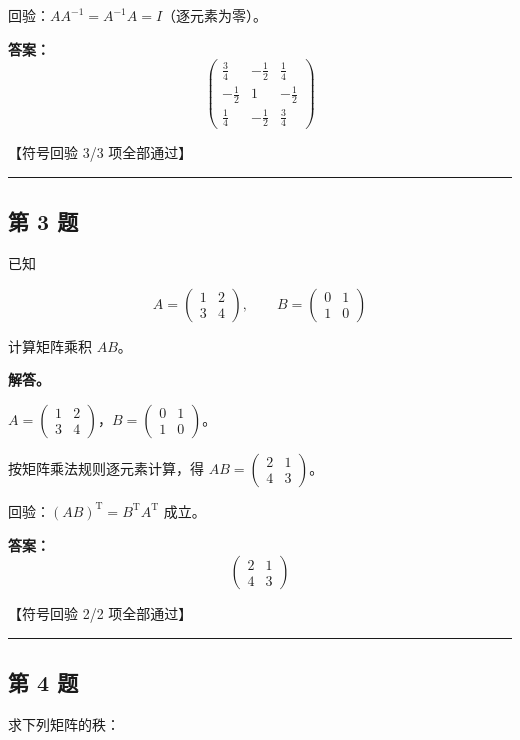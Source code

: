 \documentclass[12pt, a4paper]{article}
\newcommand{\problem}[1]{\subsection*{第 #1 题}}
\newcommand{\solution}{\textbf{解答。}}
\begin{document}
回验：$A A^{-1} = A^{-1} A = I$（逐元素为零）。

\textbf{答案：}
{\small
\[\begin{pmatrix} \frac{3}{4} & - \frac{1}{2} & \frac{1}{4} \\ - \frac{1}{2} & 1 & - \frac{1}{2} \\ \frac{1}{4} & - \frac{1}{2} & \frac{3}{4} \end{pmatrix}\]
}

\textcolor{okgreen}{【符号回验 3/3 项全部通过】}

\vspace{0.8em}
\hrule
\vspace{0.8em}

\problem{3}

已知

$$
A = \begin{pmatrix} 1 & 2 \\ 3 & 4 \end{pmatrix}, \qquad
B = \begin{pmatrix} 0 & 1 \\ 1 & 0 \end{pmatrix}
$$

计算矩阵乘积 $AB$。

\solution

$A = \begin{pmatrix} 1 & 2 \\ 3 & 4 \end{pmatrix}$，$B = \begin{pmatrix} 0 & 1 \\ 1 & 0 \end{pmatrix}$。

按矩阵乘法规则逐元素计算，得 $AB = \begin{pmatrix} 2 & 1 \\ 4 & 3 \end{pmatrix}$。

回验：$(AB)^{\mathrm{T}} = B^{\mathrm{T}}A^{\mathrm{T}}$ 成立。

\textbf{答案：}
{\small
\[\begin{pmatrix} 2 & 1 \\ 4 & 3 \end{pmatrix}\]
}

\textcolor{okgreen}{【符号回验 2/2 项全部通过】}

\vspace{0.8em}
\hrule
\vspace{0.8em}

\problem{4}

求下列矩阵的秩：
\end{document}
